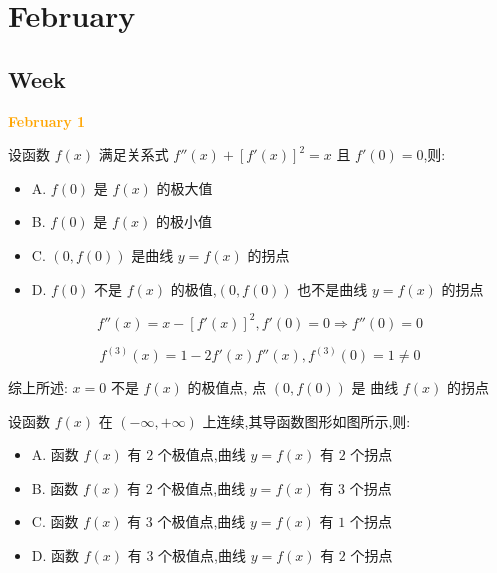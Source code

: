 \chapter{February}
\section{Week }
\textcolor{orange}{\textbf{February 1}}

\begin{example}[][Exam: 28.1.1]
	设函数 $f(x)$ 满足关系式 $f''(x)+[f'(x)]^{2}=x$ 且 $f'(0)=0$,则:
\begin{itemize}
	\item A. $f(0)$ 是 $f(x)$ 的极大值
	\item B. $f(0)$ 是 $f(x)$ 的极小值
	\item C. $(0,f(0))$ 是曲线 $y=f(x)$ 的拐点
	\item D. $f(0)$ 不是 $f(x)$ 的极值,$(0,f(0))$ 也不是曲线 $y=f(x)$ 的拐点
\end{itemize}
\end{example}

\begin{solution}

	$$f''(x) = x - [f'(x)]^{2}, f'(0) = 0\Rightarrow f''(0) = 0$$
	
	$$f^{(3)}(x) = 1 - 2f'(x)f''(x), f^{(3)}(0) = 1\neq 0$$

	综上所述: $x=0$ 不是 $f(x)$ 的极值点, 点 $(0,f(0))$ 是 曲线 $f(x)$ 的拐点
\end{solution}

\begin{example}[][Exam: 28.1.2]
	设函数 $f(x)$ 在 $(-\infty,+\infty)$ 上连续,其导函数图形如图所示,则:
\begin{itemize}
	\item A. 函数 $f(x)$ 有 $2$ 个极值点,曲线 $y=f(x)$ 有 $2$ 个拐点
	\item B. 函数 $f(x)$ 有 $2$ 个极值点,曲线 $y=f(x)$ 有 $3$ 个拐点
	\item C. 函数 $f(x)$ 有 $3$ 个极值点,曲线 $y=f(x)$ 有 $1$ 个拐点
	\item D. 函数 $f(x)$ 有 $3$ 个极值点,曲线 $y=f(x)$ 有 $2$ 个拐点
\end{itemize}
\end{example}

